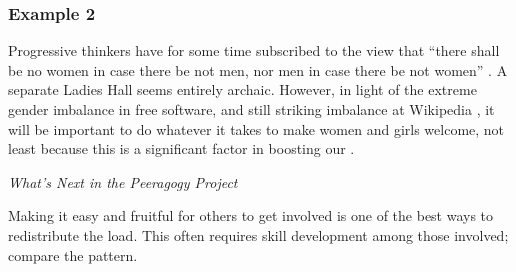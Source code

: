 \subsubsection*{Example 2}
Progressive thinkers have for
some time subscribed to the view that ``there shall be no women in
case there be not men, nor men in case there be not women''
\cite[Chapter 1.LII]{rabelais1894gargantua}.
A separate Ladies Hall seems entirely archaic.
However, in light of the
extreme gender imbalance in free software, and still striking
imbalance at Wikipedia \cite{gender,FM4291}, it will be important to
do whatever it takes to make women and girls welcome, not least
because this is a significant factor in boosting our
.


\begin{framed}
\noindent 
\emph{What's Next in the Peeragogy Project}
\begin{collectinmacro}{\CarryingWN}{}{}
Making it easy and fruitful for others to get involved is one of the best ways to redistribute the load.  This often requires skill development among those involved; compare the  pattern.
\end{collectinmacro}
\CarryingWN
\end{framed}



  
